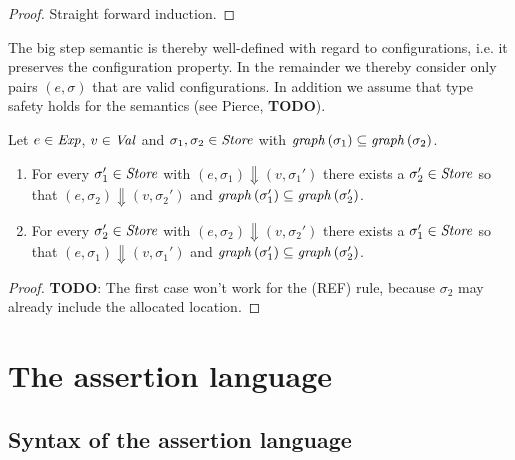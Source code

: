 \documentclass[12pt,a4paper]{report}
\begin{document}
\begin{proof}
  Straight forward induction.
\end{proof}

The big step semantic is thereby well-defined with regard to configurations, i.e. it preserves
the configuration property. In the remainder
we thereby consider only pairs $(e,\sigma)$ that are valid configurations. In addition we
assume that type safety holds for the semantics (see Pierce, {\bf TODO}).

\begin{lemma}
  Let $e\in\mathit{Exp}$, $v\in\mathit{Val}$ and $\sigma_1,\sigma_2\in\mathit{Store}$ with $\mathit{graph}\,(\sigma_1) \subseteq \mathit{graph}\,(\sigma_2)$.
  \begin{enumerate}
    \item For every $\sigma_1'\in\mathit{Store}$ with $(e,\sigma_1) \Downarrow (v,\sigma_1')$ there exists a
          $\sigma_2'\in\mathit{Store}$ so that $(e,\sigma_2) \Downarrow (v,\sigma_2')$ and
          $\mathit{graph}\,(\sigma_1') \subseteq \mathit{graph}\,(\sigma_2')$.

    \item For every $\sigma_2'\in\mathit{Store}$ with $(e,\sigma_2) \Downarrow (v,\sigma_2')$ there exists a
          $\sigma_1'\in\mathit{Store}$ so that $(e,\sigma_1) \Downarrow (v,\sigma_1')$ and
          $\mathit{graph}\,(\sigma_1') \subseteq \mathit{graph}\,(\sigma_2')$.
  \end{enumerate}
\end{lemma}

\begin{proof}
  {\bf TODO}: The first case won't work for the (REF) rule, because $\sigma_2$ may already include
  the allocated location.
\end{proof}




\chapter{The assertion language}



\section{Syntax of the assertion language}
\end{document}
